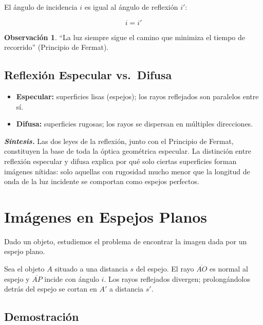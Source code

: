 \documentclass[12pt, a4paper]{article}
\theoremstyle{definition}
\newtheorem{observacion}{Observación}[section]
\begin{document}
El ángulo de incidencia \(i\) es igual al ángulo de reflexión \(i'\):

\begin{equation}
  i = i'
  \label{eq:reflexion}
\end{equation}

\begin{observacion}
``La luz siempre sigue el camino que minimiza el tiempo de recorrido'' (Principio de Fermat).
\end{observacion}

\subsection{Reflexión Especular vs.\ Difusa}

\begin{itemize}
  \item \textbf{Especular:} superficies lisas (espejos); los rayos reflejados son paralelos entre sí.
  \item \textbf{Difusa:} superficies rugosas; los rayos se dispersan en múltiples direcciones.
\end{itemize}

\textit{\textbf{Síntesis.}} Las dos leyes de la reflexión, junto con el Principio de Fermat, constituyen la base de toda la óptica geométrica especular. La distinción entre reflexión especular y difusa explica por qué solo ciertas superficies forman imágenes nítidas: solo aquellas con rugosidad mucho menor que la longitud de onda de la luz incidente se comportan como espejos perfectos.

\section{Imágenes en Espejos Planos}

Dado un objeto, estudiemos el problema de encontrar la imagen dada por un espejo plano.

Sea el objeto \(A\) situado a una distancia \(s\) del espejo. El rayo \(\overline{AO}\) es normal al espejo y \(\overline{AP}\) incide con ángulo \(i\). Los rayos reflejados divergen; prolongándolos detrás del espejo se cortan en \(A'\) a distancia \(s'\).

\subsection{Demostración}
\end{document}
